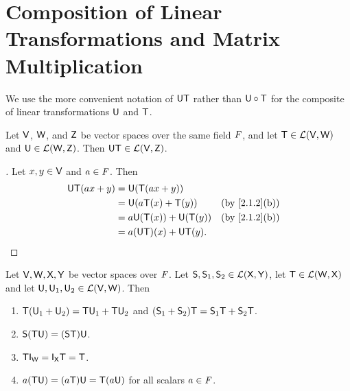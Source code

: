 \section{Composition of Linear Transformations and Matrix Multiplication}\label{sec:2.3}

\begin{note}
	We use the more convenient notation of \(\mathsf{U} \mathsf{T}\) rather than \(\mathsf{U} \circ \mathsf{T}\) for the composite of linear transformations \(\mathsf{U}\) and \(\mathsf{T}\).
\end{note}

\begin{thm}\label{2.9}
	Let \(\mathsf{V}\), \(\mathsf{W}\), and \(\mathsf{Z}\) be vector spaces over the same field \(\mathit{F}\), and let \(\mathsf{T} \in \mathcal{L}(\mathsf{V}, \mathsf{W})\) and \(\mathsf{U} \in \mathcal{L}(\mathsf{W}, \mathsf{Z})\).
	Then \(\mathsf{U} \mathsf{T} \in \mathcal{L}(\mathsf{V}, \mathsf{Z})\).
\end{thm}

\begin{proof}[]
	Let \(x, y \in \mathsf{V}\) and \(a \in \mathit{F}\).
	Then
	\begin{align*}
		\U \T(ax + y) & = \U(\T(ax + y))                              \\
		              & = \U(a \T(x) + \T(y))      &  & \by{2.1.2}[b] \\
		              & = a \U(\T(x)) + \U(\T(y))  &  & \by{2.1.2}[b] \\
		              & = a (\U \T)(x) + \U \T(y).
	\end{align*}
\end{proof}

\begin{thm}\label{2.10}
	Let \(\mathsf{V}, \mathsf{W}, \mathsf{X}, \mathsf{Y}\) be vector spaces over \(\mathit{F}\).
	Let \(\mathsf{S}, \mathsf{S}_1, \mathsf{S}_2 \in \mathcal{L}(\mathsf{X}, \mathsf{Y})\), let \(\mathsf{T} \in \mathcal{L}(\mathsf{W}, \mathsf{X})\) and let \(\mathsf{U}, \mathsf{U}_1, \mathsf{U}_2 \in \mathcal{L}(\mathsf{V}, \mathsf{W})\).
	Then
	\begin{enumerate}
		\item \(\mathsf{T}(\mathsf{U}_1 + \mathsf{U}_2) = \mathsf{T} \mathsf{U}_1 + \mathsf{T} \mathsf{U}_2\) and \((\mathsf{S}_1 + \mathsf{S}_2) \mathsf{T} = \mathsf{S}_1 \mathsf{T} + \mathsf{S}_2 \mathsf{T}\).
		\item \(\mathsf{S} (\mathsf{T} \mathsf{U}) = (\mathsf{S} \mathsf{T}) \mathsf{U}\).
		\item \(\T \IT[\W] = \IT[\vs{X}] \T = \T\).
		\item \(a(\mathsf{T} \mathsf{U}) = (a \mathsf{T}) \mathsf{U} = \mathsf{T} (a \mathsf{U})\) for all scalars \(a \in \mathit{F}\).
	\end{enumerate}
\end{thm}

